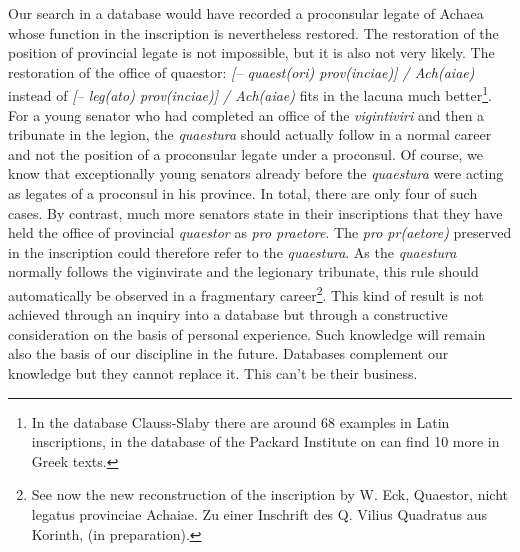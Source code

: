 \documentclass[amsthm,ebook]{saparticle}
\begin{document}
Our search in a database would have recorded a proconsular legate of Achaea whose 
function in the inscription is nevertheless restored. The restoration of the position 
of provincial legate is not impossible, but it is also not very likely. The restoration 
of the office of quaestor:\textit{ [-- quaest(ori) prov(inciae)] / Ach(aiae) }instead 
of \textit{[-- leg(ato) prov(inciae)] / Ach(aiae) }fits in the lacuna much better\footnote{In the database Clauss-Slaby there are around 68 examples in Latin inscriptions, in the database of the Packard Institute on can find 10 more in Greek texts.}. 
For a young senator who had completed an office of the \textit{vigintiviri }and 
then a tribunate in the legion, the \textit{quaestura }should actually follow in 
a normal career and not the position of a proconsular legate under a proconsul. 
Of course, we know that exceptionally young senators already before the \textit{quaestura 
}were acting as legates of a proconsul in his province. In total, there are only 
four of such cases. By contrast, much more senators state in their inscriptions 
that they have held the office of provincial \textit{quaestor} as\textit{ pro praetore}. 
The \textit{pro pr(aetore) }preserved in the inscription could therefore refer 
to the \textit{quaestura}. As the \textit{quaestura }normally follows the\textit{ 
}viginvirate and the legionary tribunate, this rule should automatically be observed 
in a fragmentary career\footnote{See now the new reconstruction of the inscription by W. Eck, Quaestor, nicht legatus provinciae Achaiae. Zu einer Inschrift des Q. Vilius Quadratus aus Korinth, (in preparation).}. This kind of result is not achieved through an inquiry 
into a database but through a constructive consideration on the basis of personal 
experience. Such knowledge will remain also the basis of our discipline in the 
future. Databases complement our knowledge but they cannot replace it. This can't 
be their business. 
\end{document}
